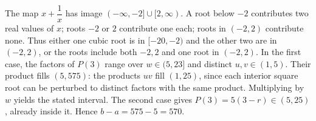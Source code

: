 The map $x+\dfrac{1}{x}$ has image $(-\infty,-2]\cup[2,\infty)$. A root below $-2$ contributes two real values of $x$; roots $-2$ or $2$ contribute one each; roots in $(-2,2)$ contribute none. Thus either one cubic root is in $[-20,-2)$ and the other two are in $(-2,2)$, or the roots include both $-2,2$ and one root in $(-2,2)$. In the first case, the factors of $P(3)$ range over $w\in(5,23]$ and distinct $u,v\in(1,5)$. Their product fills $(5,575)$: the products $uv$ fill $(1,25)$, since each interior square root can be perturbed to distinct factors with the same product. Multiplying by $w$ yields the stated interval. The second case gives $P(3)=5(3-r)\in(5,25)$, already inside it. Hence $b-a=575-5=\boxed{570}$.
